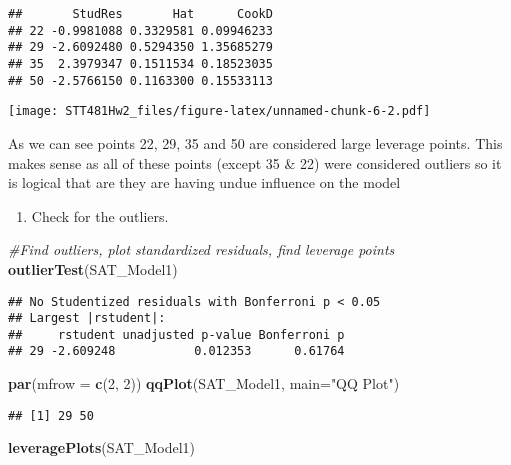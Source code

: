 \documentclass[]{article}
\newenvironment{Shaded}{\begin{snugshade}}{\end{snugshade}}
\newcommand{\KeywordTok}[1]{\textcolor[rgb]{0.13,0.29,0.53}{\textbf{#1}}}
\newcommand{\DataTypeTok}[1]{\textcolor[rgb]{0.13,0.29,0.53}{#1}}
\newcommand{\DecValTok}[1]{\textcolor[rgb]{0.00,0.00,0.81}{#1}}
\newcommand{\StringTok}[1]{\textcolor[rgb]{0.31,0.60,0.02}{#1}}
\newcommand{\CommentTok}[1]{\textcolor[rgb]{0.56,0.35,0.01}{\textit{#1}}}
\newcommand{\NormalTok}[1]{#1}
\providecommand{\tightlist}{%
  \setlength{\itemsep}{0pt}\setlength{\parskip}{0pt}}
\begin{document}
\begin{verbatim}
##       StudRes       Hat      CookD
## 22 -0.9981088 0.3329581 0.09946233
## 29 -2.6092480 0.5294350 1.35685279
## 35  2.3979347 0.1511534 0.18523035
## 50 -2.5766150 0.1163300 0.15533113
\end{verbatim}

\texttt{[image: STT481Hw2\_files/figure-latex/unnamed-chunk-6-2.pdf]}

As we can see points 22, 29, 35 and 50 are considered large leverage
points. This makes sense as all of these points (except 35 \& 22) were
considered outliers so it is logical that are they are having undue
influence on the model

\begin{enumerate}
\def\labelenumi{(\alph{enumi})}
\setcounter{enumi}{3}
\tightlist
\item
  Check for the outliers.
\end{enumerate}

\begin{Shaded}
\begin{Highlighting}[]
\CommentTok{#Find outliers, plot standardized residuals, find leverage points }
\KeywordTok{outlierTest}\NormalTok{(SAT_Model1) }
\end{Highlighting}
\end{Shaded}

\begin{verbatim}
## No Studentized residuals with Bonferroni p < 0.05
## Largest |rstudent|:
##     rstudent unadjusted p-value Bonferroni p
## 29 -2.609248           0.012353      0.61764
\end{verbatim}

\begin{Shaded}
\begin{Highlighting}[]
\KeywordTok{par}\NormalTok{(}\DataTypeTok{mfrow =} \KeywordTok{c}\NormalTok{(}\DecValTok{2}\NormalTok{, }\DecValTok{2}\NormalTok{))}
\KeywordTok{qqPlot}\NormalTok{(SAT_Model1, }\DataTypeTok{main=}\StringTok{"QQ Plot"}\NormalTok{) }
\end{Highlighting}
\end{Shaded}

\begin{verbatim}
## [1] 29 50
\end{verbatim}

\begin{Shaded}
\begin{Highlighting}[]
\KeywordTok{leveragePlots}\NormalTok{(SAT_Model1)}
\end{Highlighting}
\end{Shaded}
\end{document}
